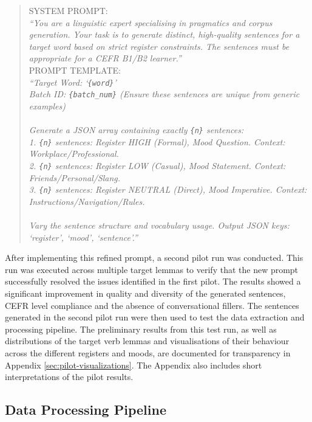 \documentclass[11pt,a4paper]{article}
\begin{document}
\begin{quote}\label{refined-prompt}
    SYSTEM PROMPT: \\
    \textit{``You are a linguistic expert specialising in pragmatics and corpus generation. Your task is to generate distinct, high-quality sentences for a target word based on strict register constraints. The sentences must be appropriate for a CEFR B1/B2 learner.''}
    \\
    PROMPT TEMPLATE: \\
    \textit{``Target Word: `\texttt{\{word\}}'\\
    Batch ID: \texttt{\{batch\_num\}} (Ensure these sentences are unique from generic examples)\\
    \\
    Generate a JSON array containing exactly \texttt{\{n\}} sentences:\\
    1. \texttt{\{n\}} sentences: Register HIGH (Formal), Mood Question. Context: Workplace/Professional.\\
    2. \texttt{\{n\}} sentences: Register LOW (Casual), Mood Statement. Context: Friends/Personal/Slang.\\
    3. \texttt{\{n\}} sentences: Register NEUTRAL (Direct), Mood Imperative. Context: Instructions/Navigation/Rules.\\
    \\
    Vary the sentence structure and vocabulary usage. Output JSON keys: `register', `mood', `sentence'.''}
\end{quote}

After implementing this refined prompt, a second pilot run was conducted. This run was executed across multiple target lemmas to verify that the new prompt successfully resolved the issues identified in the first pilot. The results showed a significant improvement in quality and diversity of the generated sentences, CEFR level compliance and the absence of conversational fillers. The sentences generated in the second pilot run were then used to test the data extraction and processing pipeline. The preliminary results from this test run, as well as distributions of the target verb lemmas and visualisations of their behaviour across the different registers and moods, are documented for transparency in Appendix \ref{sec:pilot-visualizations}. The Appendix also includes short interpretations of the pilot results.

\subsection{Data Processing Pipeline}\label{subsec:data-pipeline}
\end{document}
